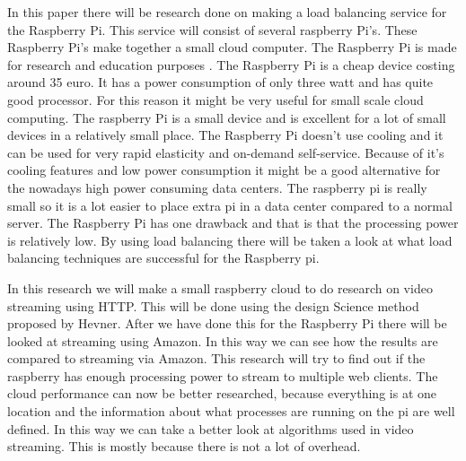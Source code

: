 \documentclass{sig-alternate-br}
\begin{document}
In this paper there will be research done on making a load balancing service for the Raspberry Pi.  This service will consist of several raspberry Pi's. These Raspberry Pi's make together a small cloud computer.  The Raspberry Pi is made for research and education purposes \cite{raspberry-pi}. The Raspberry Pi is a cheap device costing around 35 euro. It has a power consumption of only three watt and has quite good processor. For this reason it might be very useful for small scale cloud computing. The raspberry Pi is a small device and is excellent for a lot of small devices in a relatively small place. The Raspberry Pi doesn't use cooling and it can be used for very rapid elasticity and on-demand self-service. Because of it's cooling features and low power consumption it might be a good alternative for the nowadays high power consuming data centers. The raspberry pi is really small so it is a lot easier to place extra pi in a data center compared to a normal server. The Raspberry Pi has one drawback and that is that the processing power is relatively low. By using load balancing there will be taken a look at what load balancing techniques are successful for the Raspberry pi. 

In this research we will make a small raspberry cloud to do research on video streaming using HTTP. This will be done using the design Science method proposed by Hevner\cite{hevner:2007}. After we have done this for the Raspberry Pi there will be looked at streaming using Amazon. In this way we can see how the results are compared to streaming via Amazon. This research will try to find out if the raspberry has enough processing power to stream to multiple web clients. The cloud performance can now be better researched, because everything is at one location and the information about what processes are running on the pi are well defined. In this way we can take a better look at algorithms used in video streaming. This is mostly because there is not a lot of overhead. 



%
%
\vspace{50 mm}
\newpage
\end{document}
